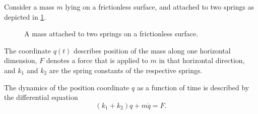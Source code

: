 \begin{example}
    \label{exa:sping-mass-lti}
    Consider a mass $m$ lying on a frictionless surface, and attached to two springs as depicted in \cref{fig:LTI-example_two-springs-one-mass}.

    \begin{figure}[h]
        \centering
        \caption{A mass attached to two springs on a frictionless surface.}
        \label{fig:LTI-example_two-springs-one-mass}
    \end{figure}

    The coordinate $q(t)$ describes position of the mass along one horizontal dimension, $F$ denotes a force that is applied to $m$ in that horizontal direction, and $k_1$ and $k_2$ are the spring constants of the respective springs.

    The dynamics of the position coordinate $q$ as a function of time is described by the differential equation
    \begin{equation}\label{eq:LTI-exa-double-spring-equation}
        (k_1 + k_2)q + m \ddot q = F.
    \end{equation}


\end{example}
